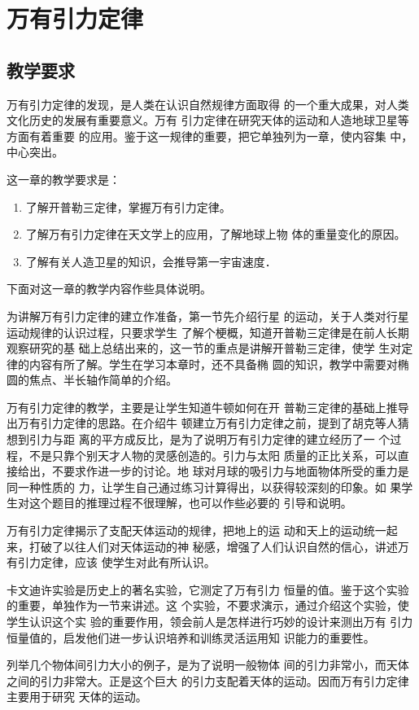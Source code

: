 \chapter{万有引力定律}
\section{教学要求}
万有引力定律的发现，是人类在认识自然规律方面取得
的一个重大成果，对人类文化历史的发展有重要意义。万有
引力定律在研究天体的运动和人造地球卫星等方面有着重要
的应用。鉴于这一规律的重要，把它单独列为一章，使内容集
中，中心突出。

这一章的教学要求是：
\begin{enumerate}
\item 了解开普勒三定律，掌握万有引力定律。
\item 了解万有引力定律在天文学上的应用，了解地球上物
体的重量变化的原因。
\item 了解有关人造卫星的知识，会推导第一宇宙速度．
\end{enumerate}

下面对这一章的教学内容作些具体说明。

为讲解万有引力定律的建立作准备，第一节先介绍行星
的运动，关于人类对行星运动规律的认识过程，只要求学生
了解个梗概，知道开普勒三定律是在前人长期观察研究的基
础上总结出来的，这一节的重点是讲解开普勒三定律，使学
生对定律的内容有所了解。学生在学习本章时，还不具备椭
圆的知识，教学中需要对椭圆的焦点、半长轴作简单的介绍。

万有引力定律的教学，主要是让学生知道牛顿如何在开
普勒三定律的基础上推导出万有引力定律的思路。在介绍牛
顿建立万有引力定律之前，提到了胡克等人猜想到引力与距
离的平方成反比，是为了说明万有引力定律的建立经历了一
个过程，不是只靠个别天才人物的灵感创造的。引力与太阳
质量的正比关系，可以直接给出，不要求作进一步的讨论。地
球对月球的吸引力与地面物体所受的重力是同一种性质的
力，让学生自己通过练习计算得出，以获得较深刻的印象。如
果学生对这个题目的推理过程不很理解，也可以作些必要的
引导和说明。

万有引力定律揭示了支配天体运动的规律，把地上的运
动和天上的运动统一起来，打破了以往人们对天体运动的神
秘感，增强了人们认识自然的信心，讲述万有引力定律，应该
使学生对此有所认识。

卡文迪许实验是历史上的著名实验，它测定了万有引力
恒量的值。鉴于这个实验的重要，单独作为一节来讲述。这
个实验，不要求演示，通过介绍这个实验，使学生认识这个实
验的重要作用，领会前人是怎样进行巧妙的设计来测出万有
引力恒量值的，启发他们进一步认识培养和训练灵活运用知
识能力的重要性。

列举几个物体间引力大小的例子，是为了说明一般物体
间的引力非常小，而天体之间的引力非常大。正是这个巨大
的引力支配着天体的运动。因而万有引力定律主要用于研究
天体的运动。

